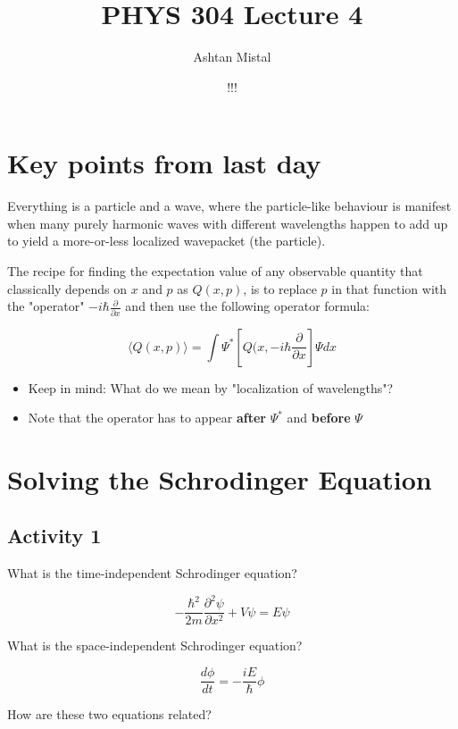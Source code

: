 \documentclass{article}
\title{PHYS 304 Lecture 4}
\author{Ashtan Mistal}
\date{!!!}
\begin{document}
\ifstandalone
\maketitle
\fi

\graphicspath{{./Lecture04/}}

\section{Key points from last day}

Everything is a particle and a wave, where the particle-like behaviour is manifest when many purely harmonic waves with different wavelengths happen to add up to yield a more-or-less localized wavepacket (the particle).  

The recipe for finding the expectation value of any observable quantity that classically depends on $x$ and $p$ as $Q(x,p)$, is to replace $p$ in that function with the "operator" $-i \hbar \frac{\partial}{\partial x}$ and then use the following operator formula:

$$\langle Q(x,p) \rangle = \int \Psi^* \left[ Q(x, -i \hbar \frac{\partial}{\partial x} \right] \Psi dx$$

\begin{itemize}
    \item Keep in mind: What do we mean by "localization of wavelengths"?
    \item Note that the operator has to appear \textbf{after} $\Psi^*$ and \textbf{before} $\Psi$
\end{itemize} 


\section{Solving the Schrodinger Equation}

\subsection{Activity 1}

What is the time-independent Schrodinger equation?

$$- \frac{\hbar^2}{2m} \frac{\partial^2 \psi}{\partial x^2} + V \psi = E \psi$$

What is the space-independent Schrodinger equation?

$$\frac{d \phi}{dt} = - \frac{i E}{\hbar} \phi$$

How are these two equations related?
\end{document}
